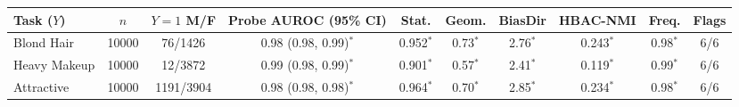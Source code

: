 \begin{tabular}{lccccccccc}
\toprule
Task ($Y$) & $n$ & $Y{=}1$ M/F & Probe AUROC (95\% CI) & Stat. & Geom. & BiasDir & HBAC-NMI & Freq. & Flags \\
\midrule
Blond Hair & 10000 & 76/1426 & 0.98 (0.98, 0.99)$^{*}$ & 0.952$^{*}$ & 0.73$^{*}$ & 2.76$^{*}$ & 0.243$^{*}$ & 0.98$^{*}$ & 6/6 \\
Heavy Makeup & 10000 & 12/3872 & 0.99 (0.98, 0.99)$^{*}$ & 0.901$^{*}$ & 0.57$^{*}$ & 2.41$^{*}$ & 0.119$^{*}$ & 0.99$^{*}$ & 6/6 \\
Attractive & 10000 & 1191/3904 & 0.98 (0.98, 0.98)$^{*}$ & 0.964$^{*}$ & 0.70$^{*}$ & 2.85$^{*}$ & 0.234$^{*}$ & 0.98$^{*}$ & 6/6 \\
\bottomrule
\end{tabular}
